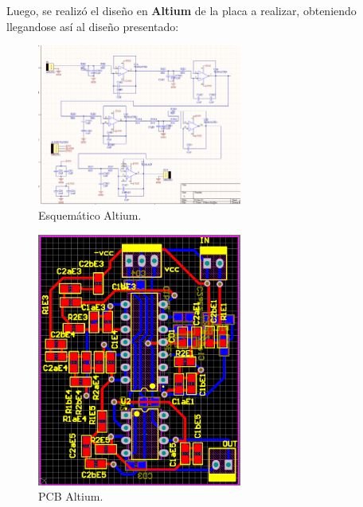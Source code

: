 Luego, se realizó el diseño en \textbf{Altium} de la placa a realizar, obteniendo llegandose así al diseño presentado:
 \begin{figure}[H]
	\centering
	\includegraphics[width=0.6\textwidth]{ImagenesEjercicio2/altiumesq.PNG}
\caption{Esquemático Altium.}
	\label{fig:altiumesq}
\end{figure}
 \begin{figure}[H]
	\centering
	\includegraphics[width=0.6\textwidth]{ImagenesEjercicio2/altiumpcb.PNG}
\caption{PCB Altium.}
	\label{fig:altiumpcb}
\end{figure}
